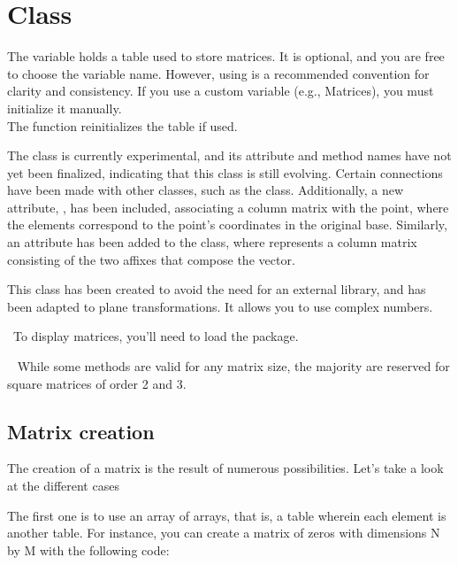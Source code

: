 \newpage\section{Class  } %
\label{sec:matrices}
The variable  holds a table used to store matrices. It is optional, and you are free to choose the variable name. However, using  is a recommended convention for clarity and consistency. If you use a custom variable (e.g., Matrices), you must initialize it manually.\\
The  function reinitializes the  table if used.

\vspace{1em}

The  class is currently experimental, and its attribute and method names have not yet been finalized, indicating that this class is still evolving. Certain connections have been made with other classes, such as the  class. Additionally, a new attribute, , has been included, associating a column matrix with the point, where the elements correspond to the point's coordinates in the original base. Similarly, an attribute has been added to the  class, where  represents a column matrix consisting of the two affixes that compose the vector.

This  class has been created to avoid the need for an external library, and has been adapted to plane transformations. It allows you to use complex numbers.

\lefthand\ To display matrices, you'll need to load the  package.

{\color{red}\lefthand\ } While some methods are valid for any matrix size, the majority are reserved for square matrices of order 2 and 3.


\subsection{Matrix creation} %
\label{sub:matrix_creation}

The creation of a matrix is the result of numerous possibilities. Let's take a look at the different cases

The first one is to use an array of arrays, that is, a table wherein each element is another table. For instance, you can create a matrix of zeros with dimensions N by M with the following code:



